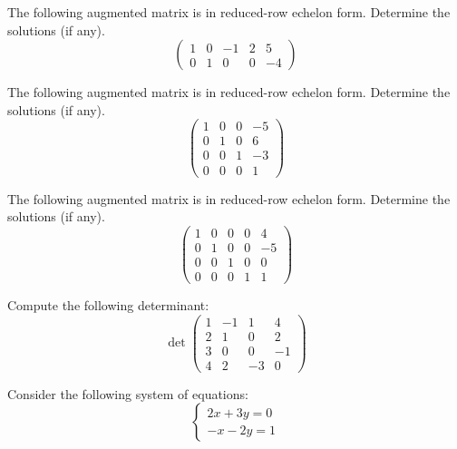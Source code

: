 \documentclass[11pt,letterpaper]{article}
\begin{document}

 The following augmented matrix is in reduced-row echelon form. Determine the solutions (if any). 
	\[
	\begin{pmatrix}
	1 & 0 & -1 & 2 & 5 \\
	0 & 1 & 0 & 0 & -4 
	\end{pmatrix}
	\]



\newpage



 The following augmented matrix is in reduced-row echelon form. Determine the solutions (if any). 
	\[
	\begin{pmatrix}
	1 & 0 & 0 & -5 \\
	0 & 1 & 0 & 6 \\
	0 & 0 & 1 & -3 \\
	0 & 0 & 0 & 1
	\end{pmatrix}
	\]



\newpage



 The following augmented matrix is in reduced-row echelon form. Determine the solutions (if any). 
	\[
	\begin{pmatrix}
	1 & 0 & 0 & 0 & 4 \\
	0 & 1 & 0 & 0 & -5 \\
	0 & 0 & 1 & 0 & 0 \\
	0 & 0 & 0 & 1 & 1
	\end{pmatrix}
	\]



\newpage



 Compute the following determinant:
	\[
	\det \begin{pmatrix}
	1 & -1 & 1 & 4 \\
	2 & 1 & 0 & 2 \\
	3 & 0 & 0 & -1 \\
	4 & 2 & -3 & 0 
	\end{pmatrix}
	\]



\newpage



 Consider the following system of equations:
	\[
	\begin{cases}
	2x + 3y= 0 \\
	-x - 2y= 1
	\end{cases}
	\]
\end{document}
